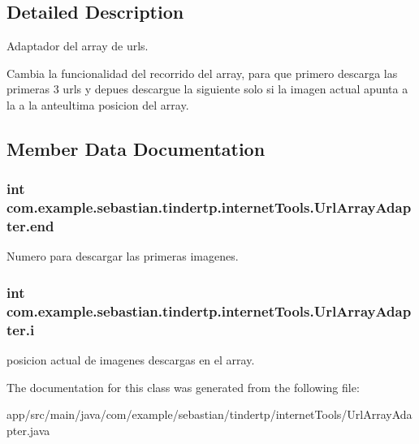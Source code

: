 \subsection{Detailed Description}
Adaptador del array de urls. 

Cambia la funcionalidad del recorrido del array, para que primero descarga las primeras 3 urls y depues descargue la siguiente solo si la imagen actual apunta a la a la anteultima posicion del array. 

\subsection{Member Data Documentation}
\subsubsection[{\texorpdfstring{end}{end}}]{\setlength{\rightskip}{0pt plus 5cm}int com.\+example.\+sebastian.\+tindertp.\+internet\+Tools.\+Url\+Array\+Adapter.\+end\hspace{0.3cm}{\ttfamily [private]}}\hypertarget{classcom_1_1example_1_1sebastian_1_1tindertp_1_1internetTools_1_1UrlArrayAdapter_a0c1d7214b9ba0224c1b8dba8d25f7e7e}{}\label{classcom_1_1example_1_1sebastian_1_1tindertp_1_1internetTools_1_1UrlArrayAdapter_a0c1d7214b9ba0224c1b8dba8d25f7e7e}
Numero para descargar las primeras imagenes. 
\subsubsection[{\texorpdfstring{i}{i}}]{\setlength{\rightskip}{0pt plus 5cm}int com.\+example.\+sebastian.\+tindertp.\+internet\+Tools.\+Url\+Array\+Adapter.\+i\hspace{0.3cm}{\ttfamily [private]}}\hypertarget{classcom_1_1example_1_1sebastian_1_1tindertp_1_1internetTools_1_1UrlArrayAdapter_a7e6801f5c125ad7971bccf99a5cc29b4}{}\label{classcom_1_1example_1_1sebastian_1_1tindertp_1_1internetTools_1_1UrlArrayAdapter_a7e6801f5c125ad7971bccf99a5cc29b4}
posicion actual de imagenes descargas en el array. 

The documentation for this class was generated from the following file\+:\begin{DoxyCompactItemize}
\item 
app/src/main/java/com/example/sebastian/tindertp/internet\+Tools/Url\+Array\+Adapter.\+java\end{DoxyCompactItemize}

